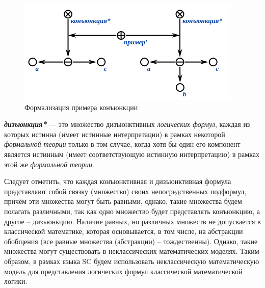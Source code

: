 \begin{figure}[http]
	\includegraphics[scale=0.8]{author/part2/figures/logic/conjunction.png}
	\caption{Формализация примера конъюнкции}
	\label{fig:conjunction}
\end{figure}


\begin{SCn}
\end{SCn}

\textbf{\textit{дизъюнкция*}} --- это множество дизъюнктивных \textit{логических формул}, каждая из которых истинна (имеет истинные интерпретации) в рамках некоторой \textit{формальной теории} только в том случае, когда хотя бы один его компонент является истинным (имеет соответствующую истинную интерпретацию) в рамках этой же \textit{формальной теории}.

Следует отметить, что каждая конъюнктивная и дизъюнктивная формула представляют собой связку (множество) своих непосредственных подформул, причём эти множества могут быть равными, однако, такие множества будем полагать различными, так как одно множество будет представлять конъюнкцию, а другое -- дизъюнкцию. Наличие равных, но различных множеств не допускается в классической математике, которая основывается, в том числе, на абстракции обобщения (все равные множества (абстракции) -- тождественны). Однако, такие множества могут существовать в неклассических математических моделях. Таким образом, в рамках языка SC будем использовать неклассическую математическую модель для представления логических формул классической математической логики.

